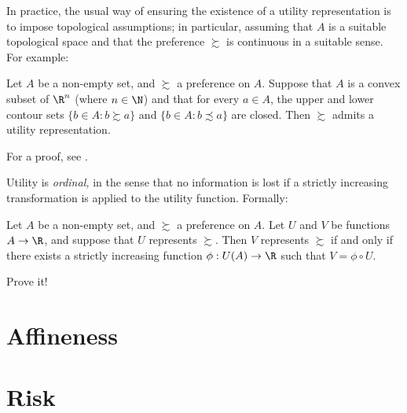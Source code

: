 \documentclass[11pt,letterpaper,reqno,oneside]{book}
\begin{document}
In practice, the usual way of ensuring the existence of a utility representation is to impose topological assumptions; in particular, assuming that $A$ is a suitable topological space and that the preference $\succsim$ is continuous in a suitable sense. For example:

\begin{theorem}
	\label{theorem:debreu}
	Let $A$ be a non-empty set, and $\succsim$ a preference on $A$. Suppose that $A$ is a convex subset of $\R^n$ (where $n \in \N$) and that for every $a \in A$, the upper and lower contour sets $\{ b \in A : b \succsim a \}$ and $\{ b \in A : b \precsim a \}$ are closed. Then $\succsim$ admits a utility representation.
\end{theorem}

For a proof, see \textcite[chapter~2]{Rubinstein2012}.

Utility is \emph{ordinal,} in the sense that no information is lost if a strictly increasing transformation is applied to the utility function. Formally:

\begin{observation}
	\label{observation:U_uniqueness}
	Let $A$ be a non-empty set, and $\succsim$ a preference on $A$. Let $U$ and $V$ be functions $A \to \R$, and suppose that $U$ represents $\succsim$. Then $V$ represents $\succsim$ if and only if there exists a strictly increasing function $\phi : U(A) \to \R$ such that $V = \phi \circ U$.
\end{observation}

\begin{exercise}
	\label{exercise:pf_U_uniqueness}
	Prove it!
\end{exercise}



\chapter{Affineness}
\label{ch_mix}





\chapter{Risk}
\label{ch_risk}
\end{document}
